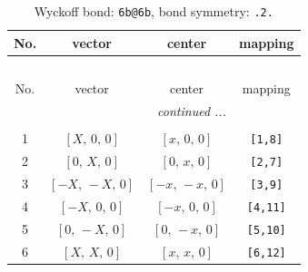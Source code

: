 \documentclass[fleqn,8pt]{jsarticle}
\begin{document}
\begin{longtable}{cccc}
\caption{Wyckoff bond: {\tt 6b@6b}, bond symmetry: {\tt .2.}}
 \\
 \hline \hline
No. & vector & center & mapping \\ \hline \endfirsthead

\multicolumn{3}{l}{\tablename\ \thetable{}} \\
 \hline \hline
No. & vector & center & mapping \\ \hline \endhead

 \hline \hline
\multicolumn{3}{r}{\footnotesize\it continued ...} \\ \endfoot

 \hline \hline
\multicolumn{3}{r}{} \\ \endlastfoot

1 & $\left[ X,\, 0,\, 0 \right]$ & $\left[ x,\, 0,\, 0 \right]$ & {\tt [1,8]} \\ \hline
2 & $\left[ 0,\, X,\, 0 \right]$ & $\left[ 0,\, x,\, 0 \right]$ & {\tt [2,7]} \\ \hline
3 & $\left[ - X,\, - X,\, 0 \right]$ & $\left[ - x,\, - x,\, 0 \right]$ & {\tt [3,9]} \\ \hline
4 & $\left[ - X,\, 0,\, 0 \right]$ & $\left[ - x,\, 0,\, 0 \right]$ & {\tt [4,11]} \\ \hline
5 & $\left[ 0,\, - X,\, 0 \right]$ & $\left[ 0,\, - x,\, 0 \right]$ & {\tt [5,10]} \\ \hline
6 & $\left[ X,\, X,\, 0 \right]$ & $\left[ x,\, x,\, 0 \right]$ & {\tt [6,12]} \\
\end{longtable}
\renewcommand{\arraystretch}{1.2}
\end{document}
